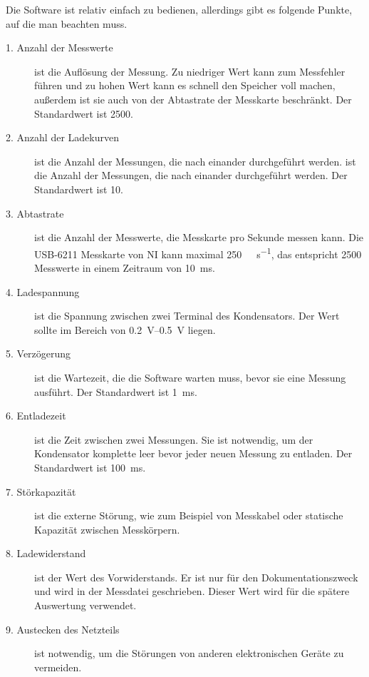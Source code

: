 Die Software ist relativ einfach zu bedienen, allerdings gibt es folgende Punkte, auf die man beachten muss.
\begin{description}
    \item[1. Anzahl der Messwerte] ist die Auflösung der Messung.
        Zu niedriger Wert kann zum Messfehler führen und zu hohen Wert kann es schnell den Speicher voll machen, außerdem ist sie auch von der Abtastrate der Messkarte beschränkt.
        Der Standardwert ist \num{2500}.

    \item[2. Anzahl der Ladekurven] ist die Anzahl der Messungen, die nach einander durchgeführt werden. ist die Anzahl der Messungen, die nach einander durchgeführt werden.
        Der Standardwert ist \num{10}.

    \item[3. Abtastrate] ist die Anzahl der Messwerte, die Messkarte pro Sekunde messen kann.
        Die USB-6211 Messkarte von NI kann maximal \SI[per-mode=symbol]{250}{\kilo\sample\per\second}, das entspricht \num{2500} Messwerte in einem Zeitraum von \SI{10}{\milli\second}.

    \item[4. Ladespannung] ist die Spannung zwischen zwei Terminal des Kondensators.
        Der Wert sollte im Bereich von \SIrange{0.2}{0.5}{\volt} liegen.

    \item[5. Verzögerung] ist die Wartezeit, die die Software warten muss, bevor sie eine Messung ausführt.
        Der Standardwert ist \SI{1}{\ms}.

    \item[6. Entladezeit] ist die Zeit zwischen zwei Messungen.
        Sie ist notwendig, um der Kondensator komplette leer bevor jeder neuen Messung zu entladen.
        Der Standardwert ist \SI{100}{\ms}.

    \item[7. Störkapazität] ist die externe Störung, wie zum Beispiel von Messkabel oder statische Kapazität zwischen Messkörpern.

    \item[8. Ladewiderstand] ist der Wert des Vorwiderstands.
        Er ist nur für den Dokumentationszweck und wird in der Messdatei geschrieben.
        Dieser Wert wird für die spätere Auswertung verwendet.

    \item[9. Austecken des Netzteils] ist notwendig, um die Störungen von anderen elektronischen Geräte zu vermeiden.
\end{description}

